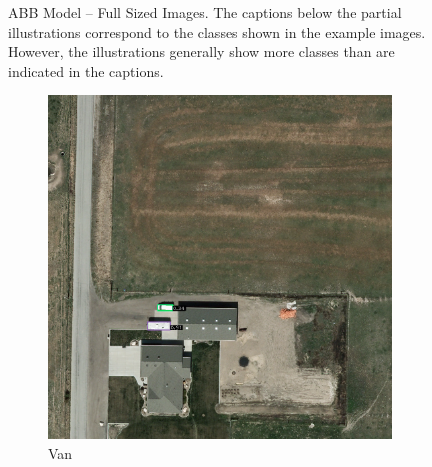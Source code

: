 \begin{figure}[h!]
    \caption[ABB Model – Full Sized Images]{ABB Model – Full Sized Images. The captions below the partial illustrations correspond to the classes shown in the example images. However, the illustrations generally show more classes than are indicated in the captions.}
    \label{fig:ABB_examples_fs}
\end{figure}

\begin{figure}[h!]
    \centering
    \begin{subfigure}[t]{0.38\textwidth}
        \centering
        \includegraphics[width=\linewidth]{images/015Results/01abb_vs_obb/comp_images/obb/198.png}
        \caption{Van}
    \end{subfigure}
    \begin{subfigure}[t]{0.38\textwidth}
        \centering

\end{subfigure}
\end{figure}
